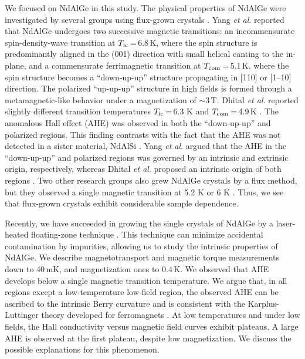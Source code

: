 \documentclass[%
preprint,
 amsmath,amssymb,
 aps,
]{revtex4-2}
\begin{document}
%
We focused on NdAlGe in this study. 
%
The physical properties of NdAlGe were investigated by several groups 
using flux-grown crystals 
\cite{Zhao_NewJPhys_2022,Yang_PhysRevMater_2023,Cho_SSRN_2022,Dhital_PhyrevB_2023}. 
%
Yang \textit{et al}. \cite{Yang_PhysRevMater_2023} reported that NdAlGe undergoes 
two successive magnetic transitions: 
an incommensurate spin-density-wave transition at $T_{\rm ic}$\,=\,6.8\,K, 
where the spin structure is predominantly aligned in the (001) direction 
with small helical canting to the in-plane, 
and a commensurate ferrimagnetic transition at $T_{\rm com}$\,=\,5.1\,K, 
where the spin structure becomes a ``down-up-up'' structure propagating in $\lbrack$110$\rbrack$ 
or $\lbrack$1--10$\rbrack$ direction. 
%
The polarized ``up-up-up'' structure in high fields is formed through a metamagnetic-like behavior under a magnetization of $\sim$3\,T. 
%
Dhital \textit{et al}. reported slightly different transition temperatures $T_{\rm ic}$\,=\,6.3 K 
and $T_{\rm com}$\,=\,4.9\,K \cite{Dhital_PhyrevB_2023}. 
%
The anomalous Hall effect (AHE) was observed in both the ``down-up-up'' and polarized regions. 
%
This finding contrasts with the fact that the AHE was not detected in a sister material, NdAlSi 
\cite{Yang_PhysRevMater_2023}. 
%
Yang \textit{et al}. argued that 
the AHE in the ``down-up-up'' and polarized regions was governed 
by an intrinsic and extrinsic origin, respectively, 
whereas Dhital \textit{et al}. proposed an intrinsic origin of both regions 
\cite{Yang_PhysRevMater_2023,Dhital_PhyrevB_2023}. 
%
Two other research groups also grew NdAlGe crystals by a flux method, but they observed 
a single magnetic transition at 5.2 K \cite{Zhao_NewJPhys_2022} or 6 K \cite{Cho_SSRN_2022}. 
%
Thus, we see that flux-grown crystals exhibit considerable sample dependence. 
%

%
Recently, we have succeeded in growing the single crystals of NdAlGe by a laser-heated floating-zone technique \cite{Kikugawa_inorganics_2023}. 
%
This technique can minimize accidental contamination by impurities, allowing us to study the intrinsic properties of NdAlGe. 
%
We describe magnetotransport and magnetic torque measurements down to 40\,mK, 
and magnetization ones to 0.4\,K. 
%
We observed that AHE develops below a single magnetic transition temperature. 
%
We argue that, in all regions except a low-temperature low-field region, the observed AHE 
can be ascribed to the intrinsic Berry curvature and is consistent with the Karplus-Luttinger theory 
developed for ferromagnets \cite{Karplus_PhysRev_1954}. 
%
At low temperatures and under low fields, 
the Hall conductivity versus magnetic field curves exhibit plateaus. 
%
A large AHE is observed at the first plateau, despite low magnetization. 
%
We discuss the possible explanations for this phenomenon.  
%
\end{document}
